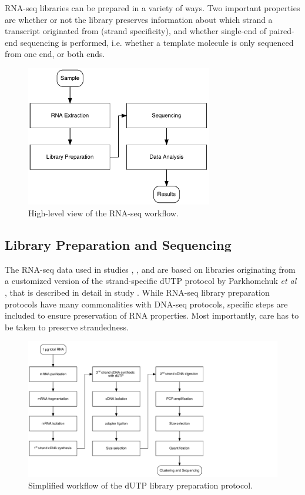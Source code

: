 \documentclass[11pt]{book}
\begin{document}
RNA-seq libraries can be prepared in a variety of ways. Two important properties are whether or not the library preserves information about which strand a transcript originated from (strand specificity), and whether single-end of paired-end sequencing is performed, i.e. whether a template molecule is only sequenced from one end, or both ends.

\begin{figure}[t]
\centering
\includegraphics[width=230pt]{img/rnaseq-general-workflow.pdf}
\caption[High-Level View of the RNA-seq Workflow]{High-level view of the RNA-seq workflow.}
\label{fig:rnaseq-overview}
\end{figure}


\subsection{Library Preparation and Sequencing}

The RNA-seq data used in studies \I, \III, and \IV are based on libraries originating from a customized version of the strand-specific dUTP protocol by Parkhomchuk \textit{et al} \cite{Parkhomchuk:2009}, that is described in detail in study \I. While RNA-seq library preparation protocols have many commonalities with DNA-seq protocols, specific steps are included to ensure preservation of RNA properties. Most importantly, care has to be taken to preserve strandedness.

\begin{figure}[t]
\centering
\includegraphics[width=320pt,trim=0 0 11cm 0,clip]{img/dutp-workflow.pdf}
\caption[Simplified dUTP Library Preparation Workflow]{Simplified workflow of the dUTP library preparation protocol.}
\label{fig:dutp}
\end{figure}
\end{document}
